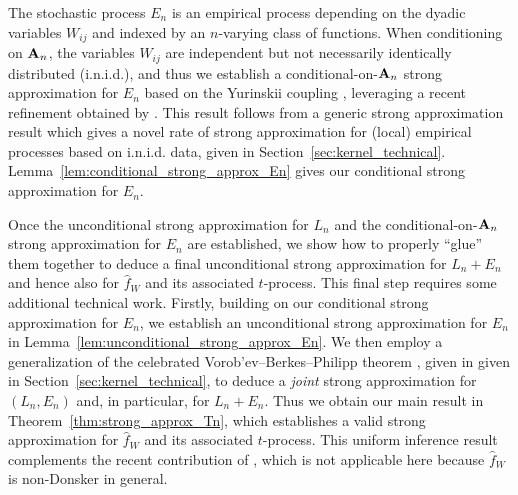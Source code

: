 The stochastic process $E_n$ is an empirical process depending on the dyadic
variables $W_{i j}$ and indexed by an $n$-varying class of functions.
When conditioning on $\mathbf{A}_n$, the variables $W_{i j}$ are independent but not
necessarily identically distributed (i.n.i.d.), and thus we establish a
conditional-on-$\mathbf{A}_n$ strong
approximation for $E_n$ based on the Yurinskii coupling
\citep{yurinskii1978error}, leveraging a recent refinement obtained by
\citet*[Lemma~38]{belloni2019conditional}.
This result follows from a generic
strong approximation result which
gives a novel rate of strong approximation for
(local) empirical processes based on i.n.i.d. data,
given in Section~\ref{sec:kernel_technical}.
Lemma~\ref{lem:conditional_strong_approx_En}
gives our conditional strong approximation for $E_n$.

Once the unconditional strong approximation for $L_n$ and the
conditional-on-$\mathbf{A}_n$ strong approximation for $E_n$ are established,
we show how to properly ``glue'' them together to deduce a final unconditional
strong approximation for $L_n+E_n$ and hence also for $\hat{f}_W$ and its
associated $t$-process. This final step requires some additional technical work.
Firstly, building on our conditional strong approximation for $E_n$, we
establish an unconditional strong approximation for $E_n$ in
Lemma~\ref{lem:unconditional_strong_approx_En}. We then employ a
generalization of the celebrated Vorob'ev--Berkes--Philipp theorem
\citep{dudley1999uniform}, given in
given in Section~\ref{sec:kernel_technical},
to deduce a \emph{joint} strong
approximation for $(L_n,E_n)$ and, in particular, for $L_n+E_n$.
Thus we obtain our main result in Theorem~\ref{thm:strong_approx_Tn},
which establishes a valid strong approximation for $\hat{f}_W$
and its associated $t$-process.
This uniform inference result complements the recent contribution of
\citet{davezies2021exchangeable}, which is not applicable
here because $\hat{f}_W$ is non-Donsker in general.

